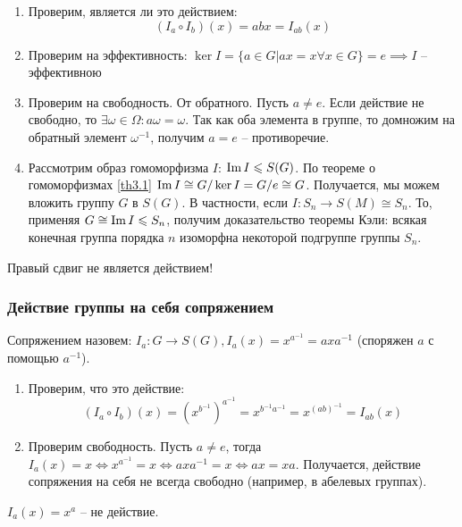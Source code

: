 \begin{enumerate}
    \item Проверим, является ли это действием: $$(I_a \circ I_b)(x) = abx = I_{ab}(x)$$
    \item Проверим на эффективность: $\ker I = \{ a \in G | ax = x \forall x \in G \} = {e} \implies I$ -- эффективною
    \item Проверим на свободность. От обратного. Пусть $a \neq e$. Если действие не свободно, то $\exists \omega \in \Omega: a\omega = \omega$. Так как оба элемента в группе, то домножим на обратный элемент $\omega^{-1}$, получим $a = e$ -- противоречие.
    \item Рассмотрим образ гомоморфизма $I$: $\operatorname{Im} I \leqslant S(G)$. По теореме о гомоморфизмах \ref{th3.1} $\operatorname{Im} I \cong G/ \ker I = G / {e} \cong G$. Получается, мы можем вложить группу $G$ в $S(G)$.
    В частности, если $I: S_n \to S(M) \cong S_n$. То, применяя $G \cong \operatorname{Im} I \leqslant S_n$, получим доказательство теоремы Кэли: всякая конечная группа порядка $n$ изоморфна некоторой подгруппе группы $S_n$.
\end{enumerate}

\begin{note}
    Правый сдвиг не является действием!
\end{note}

\subsubsection{Действие группы на себя сопряжением}
\begin{definition}
    Сопряжением назовем: $I_a: G \to S(G), I_a(x) = x^{a^{-1}} = axa^{-1}$ (споряжен $a$ с помощью $a^{-1}$).
\end{definition}

\begin{enumerate}
    \item Проверим, что это действие: $$(I_a \circ I_b)(x) = (x^{b^{-1}})^{a^{-1}} = x^{b^{-1}a^{-1}} = x^{(ab)^{-1}} = I_{ab}(x)$$
    \item Проверим свободность. Пусть $a \neq e$, тогда $I_a(x) = x \iff x^{a^{-1}} = x \iff axa^{-1} = x \iff ax = xa$. Получается, действие сопряжения на себя не всегда свободно (например, в абелевых группах).
\end{enumerate}

\begin{note}
    $I_a(x) = x^a$ -- не действие.
\end{note}


